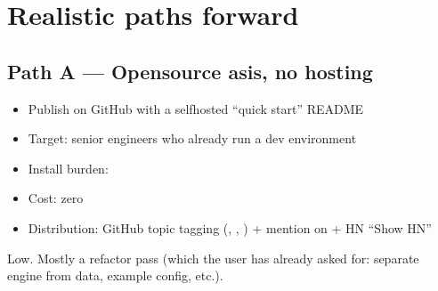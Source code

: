 \documentclass[a4paper,11pt,english]{sphinxmanual}
\begin{document}
\section{Realistic paths forward}
\label{\detokenize{analysis:realistic-paths-forward}}

\subsection{Path A — Open\sphinxhyphen{}source as\sphinxhyphen{}is, no hosting}
\label{\detokenize{analysis:path-a-open-source-as-is-no-hosting}}\begin{itemize}
\item {} 
\sphinxAtStartPar
Publish on GitHub with a self\sphinxhyphen{}hosted “quick start” README

\item {} 
\sphinxAtStartPar
Target: senior engineers who already run a dev environment

\item {} 
\sphinxAtStartPar
Install burden: 

\item {} 
\sphinxAtStartPar
Cost: zero

\item {} 
\sphinxAtStartPar
Distribution: GitHub topic tagging (, ,
) + mention on  + HN “Show HN”

\end{itemize}

\sphinxAtStartPar
{} Low. Mostly a refactor pass (which the user has already
asked for: separate engine from data, example config, etc.).
\end{document}
